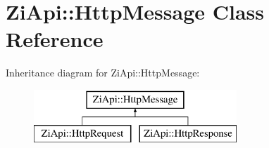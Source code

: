 \hypertarget{classZiApi_1_1HttpMessage}{}\section{Zi\+Api\+::Http\+Message Class Reference}
\label{classZiApi_1_1HttpMessage}
Inheritance diagram for Zi\+Api\+::Http\+Message\+:\begin{figure}[H]
\begin{center}
\leavevmode
\includegraphics[height=2.000000cm]{classZiApi_1_1HttpMessage}
\end{center}
\end{figure}
